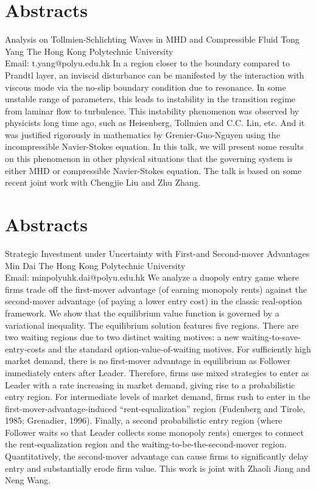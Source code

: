 \documentclass[
	openany, %
	parskip=full, %
	12pt, %
	a4paper, %
]{conferencebooklet} %
\begin{document}
\chapter*{Abstracts}
\abstract
    {Analysis on Tollmien-Schlichting Waves in MHD and Compressible Fluid}
    {Tong Yang}
    {}
    {The Hong Kong Polytechnic University\\
    Email: t.yang@polyu.edu.hk}
    {In a region closer to the boundary compared to Prandtl layer, an inviscid disturbance can be manifested by the interaction with viscous mode via the no-slip boundary condition due to resonance. In some unstable range of parameters, this leads to instability in the transition regime from laminar flow to turbulence. This instability phenomenon was observed by physicists long time ago, such as Heisenberg, Tollmien and  C.C. Lin, etc.  And it was justified rigorously in mathematics by Grenier-Guo-Nguyen using the incompressible Navier-Stokes equation. In this talk, we will present some results on this phenomenon in other physical situations that the governing system is either MHD or compressible Navier-Stokes equation.  The talk is based on some recent joint work with Chengjie Liu and Zhu Zhang.}


\chapter*{Abstracts}
\abstract
    {Strategic Investment under Uncertainty with First-and Second-mover Advantages}
    {Min Dai}
    {}
    {The Hong Kong Polytechnic University\\
    Email: minpolyuhk.dai@polyu.edu.hk}
    {We analyze a duopoly entry game where firms trade off the first-mover advantage (of earning monopoly rents) against the second-mover advantage (of paying a lower entry cost) in the classic real-option framework. We show that the equilibrium value function is governed by a variational inequality. The equilibrium solution features five regions. There are two waiting regions due to two distinct waiting motives: a new waiting-to-save-entry-costs and the standard option-value-of-waiting motives. For sufficiently high market demand, there is no first-mover advantage in equilibrium as Follower immediately enters after Leader. Therefore, firms use mixed strategies to enter as Leader with a rate increasing in market demand, giving rise to a probabilistic entry region. For intermediate levels of market demand, firms rush to enter in the first-mover-advantage-induced “rent-equalization” region (Fudenberg and Tirole, 1985; Grenadier, 1996). Finally, a second probabilistic entry region (where Follower waits so that Leader collects some monopoly rents) emerges to connect the rent-equalization region and the waiting-to-be-the-second-mover region. Quantitatively, the second-mover advantage can cause firms to significantly delay entry and substantially erode firm value. This work is joint with Zhaoli Jiang and Neng Wang.}
\end{document}
